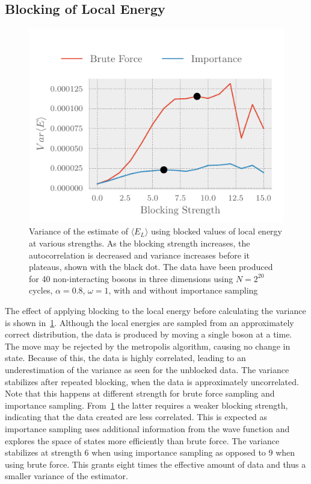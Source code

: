 \subsection{Blocking of Local Energy}
\begin{figure}
  \includegraphics{figures/blocking1.pdf}
	\centering
	\caption{Variance of the estimate of $\langle E_{L} \rangle$ using blocked values of local
      energy at various strengths. As the blocking strength increases, the
      autocorrelation is decreased and variance increases before it plateaus,
      shown with the black dot. The data have been produced for 40
      non-interacting bosons in three dimensions using $N = 2^{20}$ cycles, $\alpha =
      0.8$, $\omega = 1$, with and without importance sampling}
	\label{fig:blocking1}
\end{figure}

The effect of applying blocking to the local energy before calculating the
variance is shown in~\cref{fig:blocking1}. Although the local energies are
sampled from an approximately correct distribution, the data is produced by moving a single
boson at a time. The move may be rejected by the metropolis
algorithm, causing no change in state. Because of this, the data is highly correlated,
leading to an underestimation of the variance as seen for the unblocked data.
The variance stabilizes after repeated blocking, when the data is
approximately uncorrelated. Note that this happens at different strength
for brute force sampling and importance sampling. From~\cref{fig:blocking1}
the latter requires a weaker blocking strength, indicating that
the data created are less correlated. This is expected as
importance sampling uses additional information from the wave function and
explores the space of states more efficiently than brute force.
The variance stabilizes at strength $6$ when
using importance sampling as opposed to $9$ when using brute force. This grants
eight times the effective amount of data and thus a smaller variance of the
estimator.


